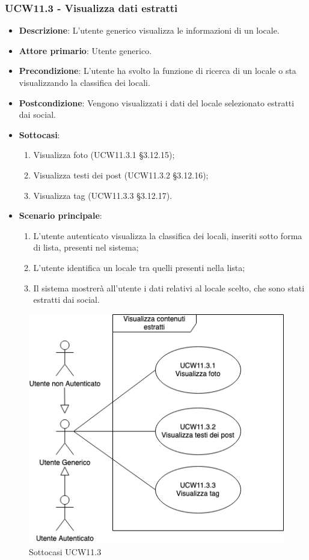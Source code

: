 \subsubsection{UCW11.3 - Visualizza dati estratti}
\begin{itemize}
    \item \textbf{Descrizione}: L'utente generico visualizza le informazioni di un locale.
    \item \textbf{Attore primario}: Utente generico.
    \item \textbf{Precondizione}: L'utente ha svolto la funzione di ricerca di un locale o sta visualizzando la classifica dei locali.
    \item \textbf{Postcondizione}: Vengono visualizzati i dati del locale selezionato estratti dai social.
    \item \textbf{Sottocasi}:
	\begin{enumerate}
		\item Visualizza foto (UCW11.3.1 \S{}3.12.15);
		\item Visualizza testi dei post (UCW11.3.2 \S{}3.12.16);
		\item Visualizza tag (UCW11.3.3 \S{}3.12.17).
	\end{enumerate}
    \item \textbf{Scenario principale}: 
    \begin{enumerate}
	\item L'utente autenticato visualizza la classifica dei locali, inseriti sotto forma di lista, presenti nel sistema;
    \item L'utente identifica un locale tra quelli presenti nella lista;
    \item Il sistema mostrerà all'utente i dati relativi al locale scelto, che sono stati estratti dai social.
    \end{enumerate}
\end{itemize}

\begin{figure}[!h]
	\centering
	\includegraphics[scale=0.5]{UC_images/UCW11-3.png} 
	\caption{Sottocasi UCW11.3}
\end{figure}

